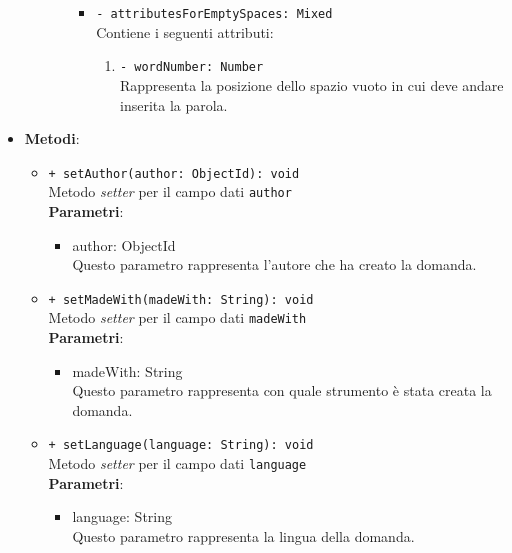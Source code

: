 \begin{itemize}
\begin{itemize}
\begin{itemize}
\begin{itemize}
\begin{enumerate}
						\end{enumerate}    
						\item \texttt{- attributesForEmptySpaces: Mixed}\\
						Contiene i seguenti attributi:
						\begin{enumerate}
							\item \texttt{- wordNumber: Number}\\
							Rappresenta la posizione dello spazio vuoto in cui deve andare inserita la parola.  
						\end{enumerate}        						  						
					\end{itemize}
				\end{itemize}			
			\end{itemize}
			\item \textbf{Metodi}: 
			\begin{itemize}
				\item \texttt{+ setAuthor(author: ObjectId): void} \\
				Metodo \textit{setter} per il campo dati \texttt{author}\\
				\textbf{Parametri}:
				\begin{itemize}
					\item {author: ObjectId}\\
					Questo parametro rappresenta l'autore che ha creato la domanda.
				\end{itemize}
				
				\item \texttt{+ setMadeWith(madeWith: String): void} \\
				Metodo \textit{setter} per il campo dati \texttt{madeWith}\\
				\textbf{Parametri}:
				\begin{itemize}
					\item {madeWith: String}\\
					Questo parametro rappresenta con quale strumento è stata creata la domanda.
				\end{itemize}
				
				\item \texttt{+ setLanguage(language: String): void} \\
				Metodo \textit{setter} per il campo dati \texttt{language}\\
				\textbf{Parametri}:
				\begin{itemize}
					\item {language: String}\\
					Questo parametro rappresenta la lingua della domanda.
				\end{itemize}
				

\end{itemize}
\end{itemize}

